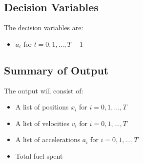 \documentclass{article}
\begin{document}
\subsection*{Decision Variables}
The decision variables are:
\begin{itemize}
    \item \( a_t \) for \( t = 0, 1, \ldots, T-1 \)
\end{itemize}

\subsection*{Summary of Output}
The output will consist of:
\begin{itemize}
    \item A list of positions \( x_i \) for \( i = 0, 1, \ldots, T \)
    \item A list of velocities \( v_i \) for \( i = 0, 1, \ldots, T \)
    \item A list of accelerations \( a_i \) for \( i = 0, 1, \ldots, T \)
    \item Total fuel spent
\end{itemize}
\end{document}
